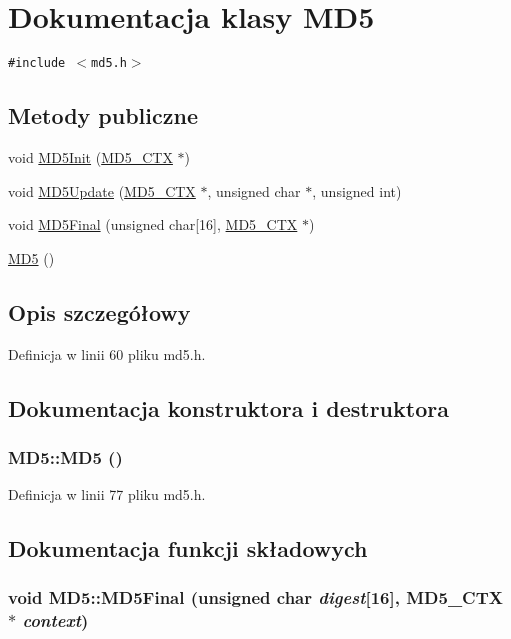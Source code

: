 \hypertarget{a00002}{
\section{Dokumentacja klasy MD5}
\label{a00002}
}
{\tt \#include $<$md5.h$>$}

\subsection*{Metody publiczne}
\begin{CompactItemize}
\item 
void \hyperlink{a00002_72b35c041cb6983aaa74e2f1c31d5a29}{MD5Init} (\hyperlink{a00003}{MD5\_\-CTX} $\ast$)
\item 
void \hyperlink{a00002_a59116f0a26354a217fa186a43cd9d28}{MD5Update} (\hyperlink{a00003}{MD5\_\-CTX} $\ast$, unsigned char $\ast$, unsigned int)
\item 
void \hyperlink{a00002_98039031d87c1f5b787050e2b487d83f}{MD5Final} (unsigned char\mbox{[}16\mbox{]}, \hyperlink{a00003}{MD5\_\-CTX} $\ast$)
\item 
\hyperlink{a00002_fa6155ec36de415ab2dcf5e54b670d13}{MD5} ()
\end{CompactItemize}


\subsection{Opis szczegółowy}


Definicja w linii 60 pliku md5.h.

\subsection{Dokumentacja konstruktora i destruktora}
\hypertarget{a00002_fa6155ec36de415ab2dcf5e54b670d13}{
\subsubsection[{MD5}]{\setlength{\rightskip}{0pt plus 5cm}MD5::MD5 ()}}
\label{a00002_fa6155ec36de415ab2dcf5e54b670d13}




Definicja w linii 77 pliku md5.h.

\subsection{Dokumentacja funkcji składowych}
\hypertarget{a00002_98039031d87c1f5b787050e2b487d83f}{
\subsubsection[{MD5Final}]{\setlength{\rightskip}{0pt plus 5cm}void MD5::MD5Final (unsigned char {\em digest}\mbox{[}16\mbox{]}, \/  {\bf MD5\_\-CTX} $\ast$ {\em context})}}
\label{a00002_98039031d87c1f5b787050e2b487d83f}




